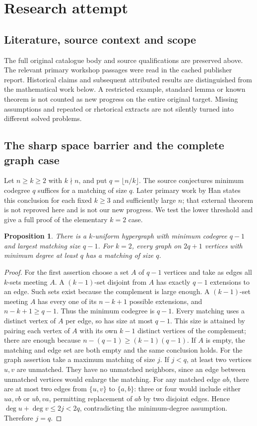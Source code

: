 \documentclass[11pt]{article}
\newtheorem{proposition}{Proposition}
\begin{document}
\section{Research attempt}
\subsection{Literature, source context and scope}
The full original catalogue body and source qualifications are preserved above. The relevant primary workshop passages were read in the cached publisher report. Historical claims and subsequent attributed results are distinguished from the mathematical work below. A restricted example, standard lemma or known theorem is not counted as new progress on the entire original target. Missing assumptions and repeated or rhetorical extracts are not silently turned into different solved problems.

\subsection{The sharp space barrier and the complete graph case}
Let $n\ge k\ge2$ with $k\nmid n$, and put $q=\lfloor n/k\rfloor$. The source conjectures minimum codegree $q$ suffices for a matching of size $q$. Later primary work by Han states this conclusion for each fixed $k\ge3$ and sufficiently large $n$; that external theorem is not reproved here and is not our new progress. We test the lower threshold and give a full proof of the elementary $k=2$ case.
\begin{proposition}
There is a $k$-uniform hypergraph with minimum codegree $q-1$ and largest matching size $q-1$. For $k=2$, every graph on $2q+1$ vertices with minimum degree at least $q$ has a matching of size $q$.
\end{proposition}
\begin{proof}
For the first assertion choose a set $A$ of $q-1$ vertices and take as edges all $k$-sets meeting $A$. A $(k-1)$-set disjoint from $A$ has exactly $q-1$ extensions to an edge. Such sets exist because the complement is large enough. A $(k-1)$-set meeting $A$ has every one of its $n-k+1$ possible extensions, and $n-k+1\ge q-1$. Thus the minimum codegree is $q-1$. Every matching uses a distinct vertex of $A$ per edge, so has size at most $q-1$. This size is attained by pairing each vertex of $A$ with its own $k-1$ distinct vertices of the complement; there are enough because $n-(q-1)\ge(k-1)(q-1)$. If $A$ is empty, the matching and edge set are both empty and the same conclusion holds.
For the graph assertion take a maximum matching of size $j$. If $j<q$, at least two vertices $u,v$ are unmatched. They have no unmatched neighbors, since an edge between unmatched vertices would enlarge the matching. For any matched edge $ab$, there are at most two edges from $\{u,v\}$ to $\{a,b\}$: three or four would include either $ua,vb$ or $ub,va$, permitting replacement of $ab$ by two disjoint edges. Hence $\deg u+\deg v\le2j<2q$, contradicting the minimum-degree assumption. Therefore $j=q$.
\end{proof}
\end{document}
